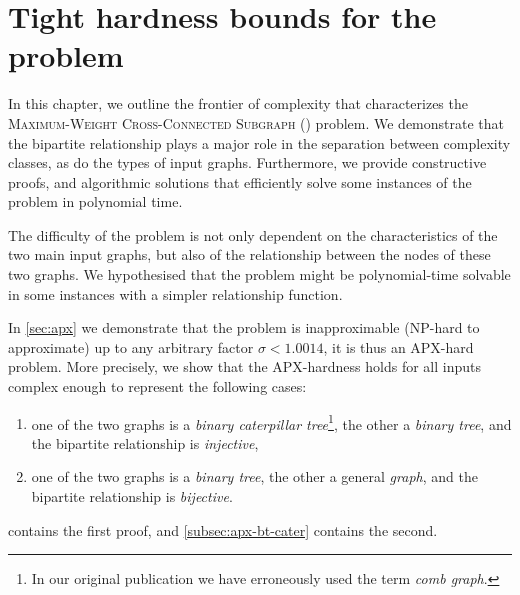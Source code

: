 \chapter[Tight hardness bounds for the \mwccs{} problem][\mwccs{}]{Tight hardness bounds for the \mwccs{} problem}
\label{chap:hard}

	In this chapter, we outline the frontier of complexity that characterizes the \textsc{Maximum-Weight Cross-Connected Subgraph} (\mwccs{}) problem.
	We demonstrate that the bipartite relationship plays a major role in the separation between complexity classes, as do the types of input graphs.
	Furthermore, we provide constructive proofs, and algorithmic solutions that efficiently solve some instances of the problem in polynomial time.

	The difficulty of the problem is not only dependent on the characteristics of the two main input graphs, but also of the relationship between the nodes of these two graphs.
	We hypothesised that the problem might be polynomial-time solvable in some instances with a simpler relationship function.

In \cref{sec:apx} we demonstrate that the \mwccs{} problem is inapproximable (NP-hard to approximate) up to any arbitrary factor $\sigma < 1.0014$, it is thus an APX-hard problem.
	More precisely, we show that the APX-hardness holds for all inputs complex enough to represent the following cases:
	\begin{enumerate}
		\item one of the two graphs is a \emph{binary caterpillar tree}\footnote{In our original publication \parencite{hume2015approximation} we have erroneously used the term \emph{comb graph}.}, the other a \emph{binary tree}, and the bipartite relationship is \emph{injective},
		\item one of the two graphs is a \emph{binary tree}, the other a general \emph{graph}, and the bipartite relationship is \emph{bijective}.
	\end{enumerate}
	 contains the first proof, and \cref{subsec:apx-bt-cater} contains the second.

